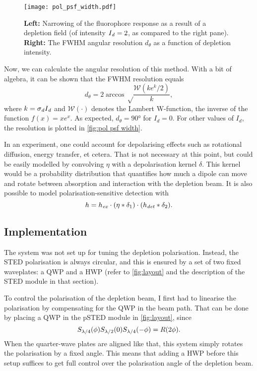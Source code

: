 \begin{figure}
	\centering
	\texttt{[image: pol\_psf\_width.pdf]}
	\caption{
		\textbf{Left:} Narrowing of the fluorophore response as a result of a depletion field (of intensity $ I_{\mathit{d}}=2 $, as compared to the right pane). \textbf{Right:} The FWHM angular resolution $ d_\theta $ as a function of depletion intensity.
	}
	\label{fig:pol psf width}
\end{figure}

Now, we can calculate the angular resolution of this method. With a bit of algebra, it can be shown that the FWHM resolution equals
\begin{equation}
	d_\theta = 2\arccos\sqrt\frac{\mathcal{W}(k e^{k}/2)}{k},
\end{equation}
where $ k = \sigma_{\mathit{d}} I_{\mathit{d}} $ and $ \mathcal{W}(\cdot) $ denotes the Lambert W-function, the inverse of the function $ f(x) = xe^x $. As expected, $ d_\theta=\ang{90} $ for $ I_d=0 $. For other values of $ I_d $, the resolution is plotted in \autoref{fig:pol psf width}.

In an experiment, one could account for depolarising effects such as rotational diffusion, energy transfer, et cetera. That is not necessary at this point, but could be easily modelled by convolving $ \eta $ with a depolarisation kernel $ \delta $. This kernel would be a probability distribution that quantifies how much a dipole can move and rotate between absorption and interaction with the depletion beam. It is also possible to model polarisation-sensitive detection with
\begin{equation}
	h = h_{\mathit{ex}} \cdot (\eta * \delta_1) \cdot (h_\mathit{det} * \delta_2).
\end{equation}





\subsection{Implementation}
\label{sec:psted implementation}

The system was not set up for tuning the depletion polarisation. Instead, the STED polarisation is always circular, and this is ensured by a set of two fixed waveplates: a QWP and a HWP (refer to \autoref{fig:layout} and the description of the STED module in that section). 

To control the polarisation of the depletion beam, I first had to linearise the polarisation by compensating for the QWP in the beam path. That can be done by placing a QWP in the pSTED module in \autoref{fig:layout}, since
\begin{equation}
	S_{\lambda/4}(\phi)S_{\lambda/2}(0)S_{\lambda/4}(-\phi) = R(2\phi).
\end{equation}
When the quarter-wave plates are aligned like that, this system simply rotates the polarisation by a fixed angle. This means that adding a HWP before this setup suffices to get full control over the polarisation angle of the depletion beam.

